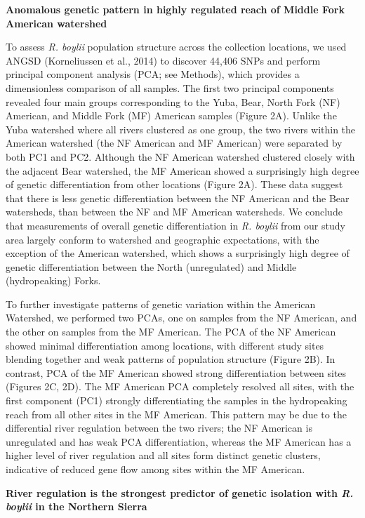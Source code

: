 \documentclass[proquest,12pt,final]{ucthesis-CA2012} %
\begin{document}
\begin{ucmainmatter}
\textbf{Anomalous genetic pattern in highly regulated reach of Middle
Fork American watershed}

To assess \emph{R. boylii} population structure across the collection
locations, we used ANGSD (Korneliussen et al., 2014) to discover 44,406
SNPs and perform principal component analysis (PCA; see Methods), which
provides a dimensionless comparison of all samples. The first two
principal components revealed four main groups corresponding to the
Yuba, Bear, North Fork (NF) American, and Middle Fork (MF) American
samples (Figure 2A). Unlike the Yuba watershed where all rivers
clustered as one group, the two rivers within the American watershed
(the NF American and MF American) were separated by both PC1 and PC2.
Although the NF American watershed clustered closely with the adjacent
Bear watershed, the MF American showed a surprisingly high degree of
genetic differentiation from other locations (Figure 2A). These data
suggest that there is less genetic differentiation between the NF
American and the Bear watersheds, than between the NF and MF American
watersheds. We conclude that measurements of overall genetic
differentiation in \emph{R. boylii} from our study area largely conform
to watershed and geographic expectations, with the exception of the
American watershed, which shows a surprisingly high degree of genetic
differentiation between the North (unregulated) and Middle
(hydropeaking) Forks.

To further investigate patterns of genetic variation within the American
Watershed, we performed two PCAs, one on samples from the NF American,
and the other on samples from the MF American. The PCA of the NF
American showed minimal differentiation among locations, with different
study sites blending together and weak patterns of population structure
(Figure 2B). In contrast, PCA of the MF American showed strong
differentiation between sites (Figures 2C, 2D). The MF American PCA
completely resolved all sites, with the first component (PC1) strongly
differentiating the samples in the hydropeaking reach from all other
sites in the MF American. This pattern may be due to the differential
river regulation between the two rivers; the NF American is unregulated
and has weak PCA differentiation, whereas the MF American has a higher
level of river regulation and all sites form distinct genetic clusters,
indicative of reduced gene flow among sites within the MF American.

\textbf{River regulation is the strongest predictor of genetic isolation
with \emph{R. boylii} in the Northern Sierra}


\end{ucmainmatter}
\end{document}
